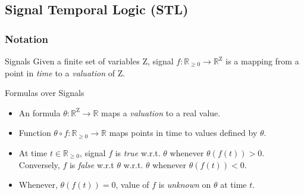 \documentclass{beamer}
\newcommand{\typeTime}{\mathbb{R}_{\geq 0}}
\newcommand{\typeReal}{\mathbb{R}}
\newcommand{\Z}{\text{Z}}
\begin{document}
\subsection{Signal Temporal Logic (STL)}
\frametitle{Notation}
\begin{frame}
    \begin{block}{Signals}
        Given a finite set of variables $\Z$, signal
        $f : \typeTime \to \typeReal^{\Z}$ is a mapping
        from a point in \textit{time} to a \textit{valuation} of $\Z$.
    \end{block}
    \pause
    \begin{block}{Formulas over Signals}
        \begin{itemize}
            \item An formula $\theta : \typeReal^{\Z} \to \typeReal$
                  maps a \textit{valuation} to a real value.
            \item Function $\theta \circ f : \typeTime \to \typeReal$
                  maps points in time to values defined by $\theta$.
            \item At time $t \in \typeTime$, signal $f$ is \textit{true}
                w.r.t. $\theta$ whenever $\theta(f (t)) > 0 $.
                Conversely, $f$ is \textit{false} w.r.t $\theta$
                w.r.t. $\theta$ whenever $\theta(f (t)) < 0 $.
            \item Whenever, $\theta(f (t)) = 0$, value of $f$
                is \textit{unknown} on $\theta$ at time $t$.
        \end{itemize}
    \end{block}
\end{frame}
\end{document}
